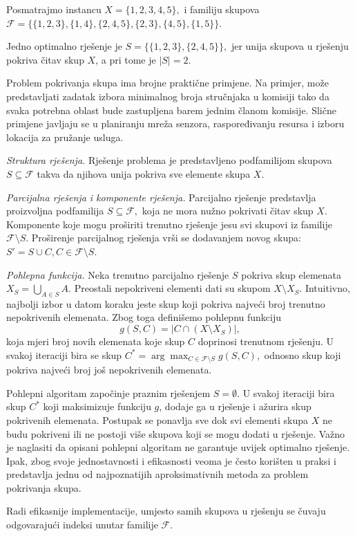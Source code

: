 \begin{solution}
	
	Posmatrajmo instancu $
	X=\{1,2,3,4,5\},$ i familiju skupova  $
	\mathcal{F}=
	\big\{
		\{1,2,3\},
		\{1,4\},
		\{2,4,5\},
		\{2,3\},
		\{4,5\},
		\{1,5\}
		\big\}.$
	
	Jedno optimalno rješenje je $S= \big\{
		\{1,2,3\},
		\{2,4,5\}
		\big\},$	jer unija skupova u rješenju pokriva čitav skup $X$, a pri tome je $|S|=2.$
	
	Problem pokrivanja skupa ima brojne praktične primjene. Na primjer, može predstavljati zadatak izbora minimalnog broja stručnjaka u komisiji tako da svaka potrebna oblast bude zastupljena barem jednim članom komisije. Slične primjene javljaju se u planiranju mreža senzora, raspoređivanju resursa i izboru lokacija za pružanje usluga.
	
	\medskip
	
	\textit{Struktura rješenja.}	Rješenje problema je predstavljeno podfamilijom skupova $S\subseteq \mathcal{F}$	takva da njihova unija pokriva sve elemente skupa $X$.
	
	\medskip
	
	\textit{Parcijalna rješenja i komponente rješenja.}
	Parcijalno rješenje predstavlja proizvoljna podfamilija
    $S\subseteq \mathcal{F},$  	koja ne mora nužno pokrivati čitav skup $X$.  Komponente koje mogu proširiti trenutno rješenje jesu svi skupovi iz familije $\mathcal{F}\setminus S.$ Proširenje parcijalnog rješenja vrši se dodavanjem novog skupa: $
	  S' = S \cup {C}, C\in \mathcal{F}\setminus S.$
	
	\medskip
	
	\textit{Pohlepna funkcija.}	Neka trenutno parcijalno rješenje $S$ pokriva skup elemenata $ X_S= \bigcup_{A\in S} A.$	Preostali nepokriveni elementi dati su skupom $
	X\setminus X_S.
	$   Intuitivno, najbolji izbor u datom koraku jeste skup koji pokriva najveći broj trenutno nepokrivenih elemenata. Zbog toga definišemo pohlepnu funkciju 	$$ g(S,C)= \left| C\cap (X\setminus X_S) \right|,$$
 koja mjeri broj novih elemenata koje skup $C$ doprinosi trenutnom rješenju.	U svakoj iteraciji bira se skup $ C^* = \arg\max_{C\in \mathcal{F}\setminus S}
	g(S,C),
	$ odnosno skup koji pokriva najveći broj još nepokrivenih elemenata.
	
	\medskip
	
	Pohlepni algoritam započinje praznim rješenjem $S=\emptyset$. U svakoj iteraciji bira skup $C^*$ koji maksimizuje funkciju $g$, dodaje ga u rješenje i ažurira skup pokrivenih elemenata. Postupak se ponavlja sve dok svi elementi skupa $X$ ne budu pokriveni ili ne postoji više skupova koji se mogu dodati u rješenje.  Važno je naglasiti da opisani pohlepni algoritam ne garantuje uvijek optimalno rješenje. Ipak, zbog svoje jednostavnosti i efikasnosti veoma je često korišten u praksi i predstavlja jednu od najpoznatijih aproksimativnih metoda za problem pokrivanja skupa.
	
	Radi efikasnije implementacije, umjesto samih skupova u rješenju se čuvaju odgovarajući indeksi unutar familije $\mathcal{F}$.
\end{solution}

